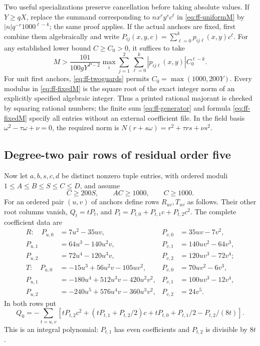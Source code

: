 \documentclass[12pt]{article}
\numberwithin{equation}{section}
\begin{document}
Two useful specializations preserve cancellation before taking absolute
values. If $Y\ge qX$, replace the summand corresponding to
$n x^ry^sc^\ell$ in \eqref{eq:ff-uniformM} by
$|n|q^{-r}1000^{\ell-k}$; the same proof applies.
If the actual anchors are fixed, first combine them algebraically and
write
$P_{ij}(x,y,c)=\sum_{\ell=0}^kp_{ij\ell}(x,y)c^\ell$.
For any established lower bound $C\ge C_0>0$, it suffices to take
\begin{equation}\label{eq:ff-fixedM}
 M>\frac{101}{100gY^{P-2}}
       \max_i\sum_{j=1}^2\sum_{\ell=0}^k
                    |p_{ij\ell}(x,y)|C_0^{\ell-k}.
\end{equation}
For unit first anchors, \eqref{eq:ff-twoguards} permits
$C_0=\max(1000,200Y)$.
Every modulus in \eqref{eq:ff-fixedM} is the square root of the exact
integer norm of an explicitly specified algebraic integer. Thus a
printed rational majorant is checked by squaring rational numbers;
the finite sum \eqref{eq:ff-generator} and formula
\eqref{eq:ff-fixedM} specify all entries without an external coefficient
file. In the field basis $\omega^2-\tau\omega+\nu=0$, the required norm
is $N(r+s\omega)=r^2+\tau rs+\nu s^2$.

\subsection{Degree-two pair rows of residual order five}

Now let $a,b,s,c,d$ be distinct nonzero tuple entries, with ordered
moduli $1\le A\le B\le S\le C\le D$, and assume
\begin{equation}\label{eq:ff-pguards}
 C\ge200S,\qquad AC\ge1000,\qquad C\ge1000.
\end{equation}
For an ordered pair $(u,v)$ of anchors define rows $R_{uv},T_{uv}$
as follows. Their other root columns vanish, $Q_t=tP_t$, and
$P_t=P_{t,0}+P_{t,1}c+P_{t,2}c^2$. The complete coefficient data are
\begin{align*}
 R:\quad P_{u,0}&=7u^2-35uv,&P_{v,0}&=35uv-7v^2,\\
 P_{u,1}&=64u^3-140u^2v,&P_{v,1}&=140uv^2-64v^3,\\
 P_{u,2}&=72u^4-120u^3v,&P_{v,2}&=120uv^3-72v^4;\\[2mm]
 T:\quad P_{u,0}&=-15u^3+56u^2v-105uv^2,&
 P_{v,0}&=70uv^2-6v^3,\\
 P_{u,1}&=-180u^4+512u^3v-420u^2v^2,&
 P_{v,1}&=100uv^3-12v^4,\\
 P_{u,2}&=-240u^5+576u^4v-360u^3v^2,&
 P_{v,2}&=24v^5.
\end{align*}
In both rows put
\begin{equation}\label{eq:ff-pzero}
 Q_0=-\sum_{t=u,v}\left[
 tP_{t,2}c^2+(tP_{t,1}+P_{t,2}/2)c
              +tP_{t,0}+P_{t,1}/2-P_{t,2}/(8t)\right].
\end{equation}
This is an integral polynomial: $P_{t,1}$ has even coefficients and
$P_{t,2}$ is divisible by $8t$.
\end{document}
